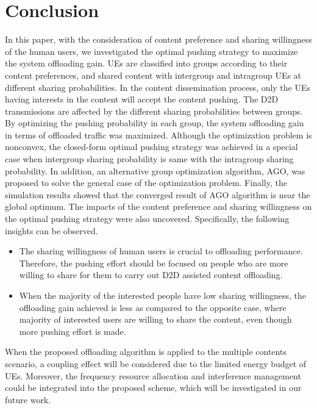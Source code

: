 \documentclass[12pt, draftclsnofoot, onecolumn]{IEEEtran}
\begin{document}
\section{Conclusion}
In this paper, with the consideration of content preference and sharing willingness of the human users, we investigated the optimal pushing strategy to maximize the system offloading gain. UEs are classified into groups according to their content preferences, and shared content with intergroup and intragroup UEs at different sharing probabilities.
In the content dissemination process, only the UEs having interests in the content will accept the content pushing. The D2D transmissions are affected by the different sharing probabilities between groups.
By optimizing the pushing probability in each group, the system offloading gain in terms of offloaded traffic was maximized. Although the optimization problem is nonconvex, the closed-form optimal pushing strategy was achieved in a special case when intergroup sharing probability is same with the intragroup sharing probability. In addition, an alternative group optimization algorithm, AGO, was proposed to solve the general case of the optimization problem. Finally, the simulation results showed that the converged result of AGO algorithm is near the global optimum. The impacts of the content preference and sharing willingness on the optimal pushing strategy were also uncovered. Specifically, the following insights can be observed.
\begin{itemize}
  \item The sharing willingness of human users is crucial to offloading performance. Therefore, the pushing effort should be focused on people who are more willing to share for them to carry out D2D assisted content offloading.
\item When the majority of the interested people have low sharing willingness, the offloading gain achieved is less as compared to the opposite case, where majority of interested users are willing to share the content, even though more pushing effort is made.
\end{itemize}

When the proposed offloading algorithm is applied to the multiple contents scenario, a coupling effect will be considered due to the limited energy budget of UEs. Moreover,  the frequency resource allocation and interference management could be integrated into the proposed scheme, which will be investigated in our future work.


\appendices
\end{document}

